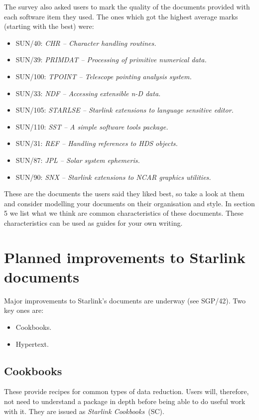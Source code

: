 \documentclass[twoside,11pt]{article}
\newcommand{\htmladdnormallink}[2]{#1}
\newcommand{\htmlref}[2]{#1}
\newcommand{\xref}[3]{#1}
\begin{document}
The survey also asked users to mark the quality of the documents provided with
each software item they used.
The ones which got the highest average marks (starting with the best) were:
\begin{itemize}
\item \xref{SUN/40}{sun40}{}: {\em CHR -- Character handling routines.}
\item \xref{SUN/39}{sun39}{}: {\em PRIMDAT -- Processing of primitive numerical data.}
\item SUN/100: {\em TPOINT -- Telescope pointing analysis system.}
\item \xref{SUN/33}{sun33}{}: {\em NDF -- Accessing extensible n-D data.}
\item SUN/105: {\em STARLSE -- Starlink extensions to language sensitive editor.}
\item SUN/110: {\em SST -- A simple software tools package.}
\item \xref{SUN/31}{sun31}{}: {\em REF -- Handling references to HDS objects.}
\item \xref{SUN/87}{sun87}{}: {\em JPL -- Solar system ephemeris.}
\item SUN/90: {\em SNX -- Starlink extensions to NCAR graphics utilities.}
\end{itemize}
These are the documents the users said they liked best, so take a look at them
and consider modelling your documents on their organisation and style.
In \htmlref{section 5}{GoodStyle} we list what we think are common
characteristics of these documents.
These characteristics can be used as guides for your own writing.

\section{Planned improvements to Starlink documents}

Major improvements to Starlink's documents are underway
(see \xref{SGP/42}{sgp42}{}).
Two key ones are:

\begin{itemize}
\item Cookbooks.
\item Hypertext.
\end{itemize}

\subsection{Cookbooks}

These provide recipes for common types of data reduction.
Users will, therefore, not need to understand a package in depth before being
able to do useful work with it.
They are issued as {\em Starlink Cookbooks}\,
(\htmladdnormallink{SC}{http://www.starlink.ac.uk/sc.html}).
\end{document}
